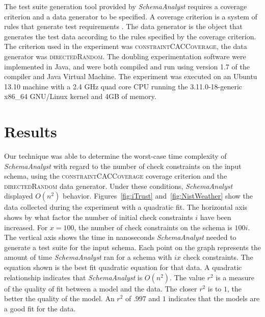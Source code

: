 \documentclass[smallextended]{svjour3}       %
\begin{document}
The test suite generation tool provided by \textit{SchemaAnalyst}
requires a coverage criterion and a data generator to be specified. A
coverage criterion is a system of rules that generate test requirements
\cite{Ammann:Testing}. The data generator is the object that generates
the test data according to the rules specified by the coverage
criterion. The criterion used in the experiment was
\textsc{constraintCACCoverage}, 
the data generator was \textsc{directedRandom}. The
doubling experimentation software were implemented in Java, and were both compiled and run using
version 1.7 of the compiler and Java Virtual Machine. The experiment was executed on an Ubuntu 13.10 machine with a 2.4
GHz quad core CPU running the 3.11.0-18-generic x86\_64 GNU/Linux
kernel and 4GB of memory.

\section{Results}
Our technique was able to determine the worst-case time
complexity of \textit{SchemaAnalyst} with regard to the number of check
constraints on the input schema, using the
\textsc{constraintCACCoverage} coverage criterion and the
\textsc{directedRandom} data generator. Under these conditions, 
\textit{SchemaAnalyst} displayed $O(n^2)$ behavior. Figures~\ref{fig:iTrust} 
and~\ref{fig:NistWeather} show the data collected during the experiment with a
quadratic fit. The horizontal axis shows by what factor the number of initial
check constraints $i$ have been increased. For $x = 100$, the number of check
constraints on the schema is $100i$. The vertical axis shows the time in
nanoseconds \textit{SchemaAnalyst} needed to generate a test suite for
the input schema. Each point on the graph represents the amount of time
\textit{SchemaAnalyst} ran for a schema with $ix$ check constraints.
The equation shown is the best fit quadratic equation for that data.  A
quadratic relationship indicates that \textit{SchemaAnalyst} is
$O(n^2)$.  The value $r^2$ is a measure of the quality of fit between a model and
the data. The closer $r^2$ is to $1$, the better the quality of the
model.  An $r^2$ of $.997$ and $1$ indicates that the models are a good fit for
the data.
\end{document}
